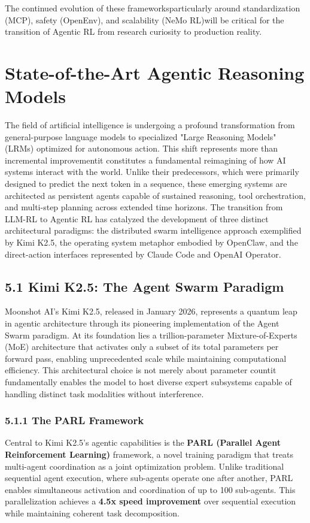 The continued evolution of these frameworksparticularly around standardization (MCP), safety (OpenEnv), and scalability (NeMo RL)will be critical for the transition of Agentic RL from research curiosity to production reality.
\section{ State-of-the-Art Agentic Reasoning Models}

The field of artificial intelligence is undergoing a profound transformation from general-purpose language models to specialized "Large Reasoning Models" (LRMs) optimized for autonomous action. This shift represents more than incremental improvementit constitutes a fundamental reimagining of how AI systems interact with the world. Unlike their predecessors, which were primarily designed to predict the next token in a sequence, these emerging systems are architected as persistent agents capable of sustained reasoning, tool orchestration, and multi-step planning across extended time horizons. The transition from LLM-RL to Agentic RL has catalyzed the development of three distinct architectural paradigms: the distributed swarm intelligence approach exemplified by Kimi K2.5, the operating system metaphor embodied by OpenClaw, and the direct-action interfaces represented by Claude Code and OpenAI Operator.

\subsection{5.1 Kimi K2.5: The Agent Swarm Paradigm}

Moonshot AI's Kimi K2.5, released in January 2026, represents a quantum leap in agentic architecture through its pioneering implementation of the Agent Swarm paradigm. At its foundation lies a trillion-parameter Mixture-of-Experts (MoE) architecture that activates only a subset of its total parameters per forward pass, enabling unprecedented scale while maintaining computational efficiency. This architectural choice is not merely about parameter countit fundamentally enables the model to host diverse expert subsystems capable of handling distinct task modalities without interference.

\subsubsection{5.1.1 The PARL Framework}

Central to Kimi K2.5's agentic capabilities is the \textbf{PARL (Parallel Agent Reinforcement Learning)} framework, a novel training paradigm that treats multi-agent coordination as a joint optimization problem. Unlike traditional sequential agent execution, where sub-agents operate one after another, PARL enables simultaneous activation and coordination of up to 100 sub-agents. This parallelization achieves a \textbf{4.5x speed improvement} over sequential execution while maintaining coherent task decomposition.


